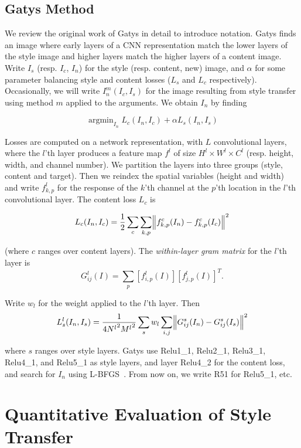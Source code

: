\documentclass[runningheads]{llncs}
\DeclareMathOperator*{\argmin}{argmin}
\begin{document}
\vspace{-2mm}
\subsection{Gatys Method}
We review the original work of Gatys \ea \cite{gatys2016image} in detail to introduce notation.
Gatys finds an image where early layers of a CNN representation match the lower layers of the style image and higher layers match the higher layers of a content image.  Write $I_{s}$ (resp. $I_{c}$, $I_{n}$)  for the style (resp. content, new) image,
and $\alpha$ for some parameter balancing style and content losses ($L_s$ and $L_c$ respectively).  Occasionally, we
will write $I_n^m(I_c, I_s)$ for the image resulting from style transfer using method $m$ applied to the arguments.
We obtain $I_{n}$ by finding

\[
{\argmin_{I_n}} L_c(I_{n}, I_{c})+\alpha L_s(I_{n}, I_{s})
\]

Losses are computed on a network representation, with $L$ convolutional layers, where the $l$'th layer
produces a feature map $f^l$ of size $H^l \times W^l \times C^l$ (resp. height, width, and channel number).  We partition
the layers into three groups (style, content and target). Then we reindex the spatial variables (height and width) and
write $f^l_{k,p}$ for the response of the $k$'th channel at the  $p$'th location in the $l$'th convolutional layer. The
content loss $L_c$ is 

\[
L_c(I_{n}, I_{c}) = \frac{1}{2}\sum_{c} \sum_{k,p} \norm{f^c_{k,p}(I_{n}) - f^c_{k,p}(I_{c})}^2
\]

\noindent (where $c$ ranges over content layers). The {\em within-layer gram
  matrix} for the $l$'th layer is
\[
G_{ij}^l(I) = \sum_p \left[f_{i,p}^l(I)\right]\left[f_{j,p}^l(I)\right]^{T}.
\]

\noindent Write $w_l$ for the weight applied to the $l$'th layer.  Then 
\[
L_s^l(I_{n}, I_{s}) = \frac{1}{4{N^l}^2{M^l}^2}\sum_{s}w_l \sum_{i,j}\norm{G^s_{ij}(I_{n})-G^s_{ij}(I_{s})}^2
\]

\noindent where $s$ ranges over style layers. Gatys \ea use Relu1\_1, Relu2\_1, Relu3\_1, Relu4\_1, and Relu5\_1 as style layers, and layer Relu4\_2 
for the content loss, and search for $I_{n}$ using L-BFGS~\cite{liu1989limited}.  From now on, we write R51 for Relu5\_1, etc. 

\section{Quantitative Evaluation of Style Transfer}\label{effcoh}
\end{document}
